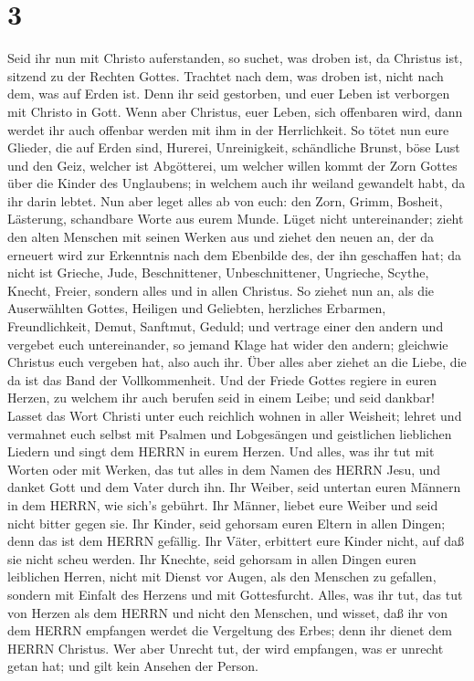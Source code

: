 \hypertarget{section-2}{%
\section{3}\label{section-2}}

 Seid ihr nun mit Christo auferstanden, so suchet, was
droben ist, da Christus ist, sitzend zu der Rechten Gottes. 
Trachtet nach dem, was droben ist, nicht nach dem, was auf Erden ist.
 Denn ihr seid gestorben, und euer Leben ist verborgen mit
Christo in Gott.  Wenn aber Christus, euer Leben, sich
offenbaren wird, dann werdet ihr auch offenbar werden mit ihm in der
Herrlichkeit.  So tötet nun eure Glieder, die auf Erden
sind, Hurerei, Unreinigkeit, schändliche Brunst, böse Lust und den Geiz,
welcher ist Abgötterei,  um welcher willen kommt der Zorn
Gottes über die Kinder des Unglaubens;  in welchem auch ihr
weiland gewandelt habt, da ihr darin lebtet.  Nun aber leget
alles ab von euch: den Zorn, Grimm, Bosheit, Lästerung, schandbare Worte
aus eurem Munde.  Lüget nicht untereinander; zieht den alten
Menschen mit seinen Werken aus  und ziehet den neuen an,
der da erneuert wird zur Erkenntnis nach dem Ebenbilde des, der ihn
geschaffen hat;  da nicht ist Grieche, Jude, Beschnittener,
Unbeschnittener, Ungrieche, Scythe, Knecht, Freier, sondern alles und in
allen Christus.  So ziehet nun an, als die Auserwählten
Gottes, Heiligen und Geliebten, herzliches Erbarmen, Freundlichkeit,
Demut, Sanftmut, Geduld;  und vertrage einer den andern und
vergebet euch untereinander, so jemand Klage hat wider den andern;
gleichwie Christus euch vergeben hat, also auch ihr.  Über
alles aber ziehet an die Liebe, die da ist das Band der Vollkommenheit.
 Und der Friede Gottes regiere in euren Herzen, zu welchem
ihr auch berufen seid in einem Leibe; und seid dankbar! 
Lasset das Wort Christi unter euch reichlich wohnen in aller Weisheit;
lehret und vermahnet euch selbst mit Psalmen und Lobgesängen und
geistlichen lieblichen Liedern und singt dem HERRN in eurem Herzen.
 Und alles, was ihr tut mit Worten oder mit Werken, das tut
alles in dem Namen des HERRN Jesu, und danket Gott und dem Vater durch
ihn.  Ihr Weiber, seid untertan euren Männern in dem HERRN,
wie sich's gebührt.  Ihr Männer, liebet eure Weiber und
seid nicht bitter gegen sie.  Ihr Kinder, seid gehorsam
euren Eltern in allen Dingen; denn das ist dem HERRN gefällig.
 Ihr Väter, erbittert eure Kinder nicht, auf daß sie nicht
scheu werden.  Ihr Knechte, seid gehorsam in allen Dingen
euren leiblichen Herren, nicht mit Dienst vor Augen, als den Menschen zu
gefallen, sondern mit Einfalt des Herzens und mit Gottesfurcht.
 Alles, was ihr tut, das tut von Herzen als dem HERRN und
nicht den Menschen,  und wisset, daß ihr von dem HERRN
empfangen werdet die Vergeltung des Erbes; denn ihr dienet dem HERRN
Christus.  Wer aber Unrecht tut, der wird empfangen, was er
unrecht getan hat; und gilt kein Ansehen der Person.

